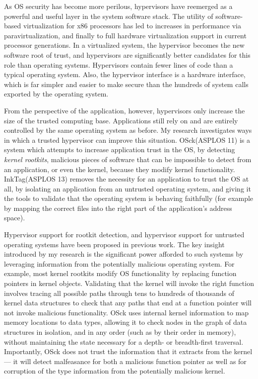 \documentclass{article}
\newcommand{\osck}{OSck\xspace}
\newcommand{\inktag}{InkTag\xspace}
\begin{document}
As OS security has become more perilous, hypervisors have reemerged as a
powerful and useful layer in the system software stack. The utility of
software-based virtualization for x86 processors has led to increases in
performance via paravirtualization, and finally to full hardware
virtualization support in current processor generations. In a virtualized
system, the hypervisor becomes the new software root of trust, and
hypervisors are significantly better candidates for this role than
operating systems. Hypervisors contain fewer lines of code than a typical
operating system. Also, the hypervisor interface is a hardware interface,
which is far simpler and easier to make secure than the hundreds of system
calls exported by the operating system.


From the perspective of the application, however, hypervisors only increase
the size of the trusted computing base. Applications still rely on and are
entirely controlled by the same operating system as before. My research
investigates ways in which a trusted hypervisor can improve this situation.
\osck (ASPLOS 11) is a system which attempts to increase application trust
in the OS, by detecting \emph{kernel rootkits}, malicious pieces of
software that can be impossible to detect from an application, or even the
kernel, because they modify kernel functionality. \inktag (ASPLOS 13)
removes the necessity for an application to trust the OS at all, by
isolating an application from an untrusted operating system, and giving it
the tools to validate that the operating system is behaving faithfully (for
example by mapping the correct files into the right part of the
application's address space).

Hypervisor support for rootkit detection, and hypervisor support for
untrusted operating systems have been proposed in previous work.
The key
insight introduced by my research is the significant power afforded to
such systems by leveraging information from the potentially malicious
operating system. For example, most kernel rootkits modify OS functionality
by replacing function pointers in kernel objects. Validating that the
kernel will invoke the right function involves tracing all possible paths
through tens to hundreds of thousands of kernel data structures to check
that any paths that end at a function pointer will not invoke malicious
functionality. \osck uses internal kernel information to map memory
locations to data types, allowing it to check nodes in the graph of data
structures in isolation, and in any order (such as by their order in
memory), without maintaining the state necessary for a depth- or
breadth-first traversal.  Importantly, \osck does not trust the information
that it extracts from the kernel --- it will detect malfeasance for both a
malicious function pointer as well as for corruption of the type
information from the potentially malicious kernel.
\end{document}
